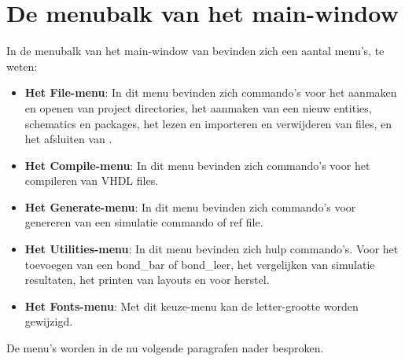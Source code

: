 \section{De menubalk van het main-window}
In de menubalk van het main-window van 
bevinden zich een aantal menu's, te weten:
\begin{itemize}
\item {\bf Het File-menu}: In dit menu
bevinden zich commando's voor het aanmaken en openen van project directories,
het aanmaken van een nieuw entities, schematics en packages,
het lezen en importeren en verwij\-deren van files,
en het afsluiten van
.
\item {\bf Het Compile-menu}: In dit menu bevinden zich commando's voor
het compileren van VHDL files.
\item {\bf Het Generate-menu}: In dit menu bevinden zich commando's voor
genereren van een simulatie commando of ref file.
\item {\bf Het Utilities-menu}: In dit menu bevinden zich hulp commando's.
Voor het toevoegen van een bond\_bar of bond\_leer, het vergelijken van simulatie resultaten,
het printen van layouts en voor herstel.
\item {\bf Het Fonts-menu}: Met dit keuze-menu kan de letter-grootte worden gewijzigd.
\end{itemize}
De menu's worden in de nu volgende paragrafen nader besproken.

